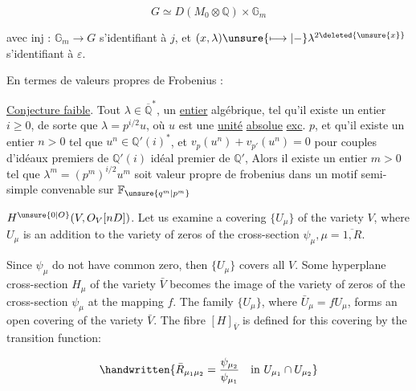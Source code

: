 \[
G\simeq D(M_0\otimes\mathbb Q)\times\mathbb G_m
\]

avec  inj : $\mathbb G_m\longrightarrow G$ s'identifiant
à $j$, et  $(x,\lambda)\unsure{\longmapsto|-}\lambda^{2\deleted{\unsure{x}}}$ s'identifiant à $\varepsilon$.

En termes de valeurs propres de Frobenius :

\uline{Conjecture faible}. Tout $\lambda\in\overline{\mathbb Q}^{*}$, 
 un \uline{entier} algébrique,
tel qu'il existe un entier $i\geq0$, de sorte
que $\lambda=p^{i/2}u$,  où $u$ est une \uline{unité}
\uline{absolue} \uline{exc}. $p$, et qu'il existe un entier
$n>0$ tel que $u^n\in\mathbb Q'(i)^*$, et $v_p(u^n)+v_{p'}(u^n)=0$
pour  couples d'idéaux premiers de $\mathbb Q'(i)$ 
  idéal premier de $\mathbb Q'$, Alors il
existe un entier $m>0$ tel que
$\lambda^m=(p^m)^{i/2}u^m$ soit  valeur propre de frobenius 
dans un motif semi-simple  convenable sur $\mathbb F_{\unsure{q^m|p^m}}$



$H^{\unsure{0|O}}(V,O_V[nD])$. Let us examine a covering $\{U_\mu\}$ of the
variety $V$, where $U_\mu$ is an addition to the variety of
zeros of the cross-section $\psi_\mu, \mu=\overline{1,R}$.

Since $\psi_\mu$ do not have common zero, then $\{U_\mu\}$
covers all $V$. Some hyperplane cross-section $H_\mu$ of the
variety $\bar V$ becomes the image of the variety of zeros of
the cross-section $\psi_\mu$ at the mapping $f$. The family
$\{U_\mu\}$, where $\bar U_\mu=fU_\mu$, forms an open covering of the
variety $\bar V$. The fibre $[H]_{\bar V}$ is defined for this
covering by the transition function:

\[
\handwritten{\bar R_{\mu_1\mu_2}=\frac{\psi_{\mu_2}}{\psi_{\mu_1}}\quad\text{in } U_{\mu_1}\cap  U_{\mu_2}}
\]

